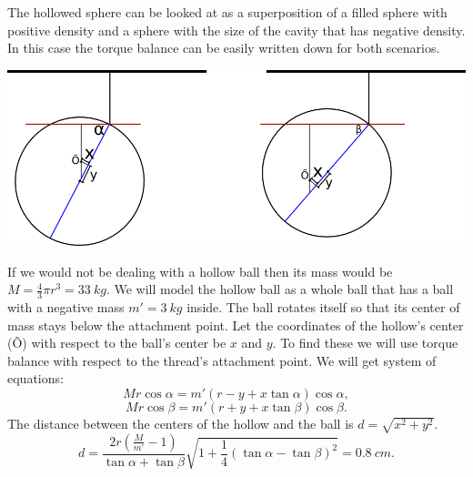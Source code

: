 \hinteng
The hollowed sphere can be looked at as a superposition of a filled sphere with positive density and a sphere with the size of the cavity that has negative density. In this case the torque balance can be easily written down for both scenarios.

\solueng
\begin{center}
\includegraphics[width=\textwidth]{2013-v2g-09-kera}
\end{center}
If we would not be dealing with a hollow ball then its mass would be $M=\frac{4}{3}\pi r^3 = \SI{33}{kg}$. We will model the hollow ball as a whole ball that has a ball with a negative mass $m'=\SI{3}{kg}$ inside. The ball rotates itself so that its center of mass stays below the attachment point. Let the coordinates of the hollow’s center (Õ) with respect to the ball’s center be $x$ and $y$. To find these we will use torque balance with respect to the thread’s attachment point. We will get system of equations:
\[Mr \cos \alpha = m'(r-y+x \tan \alpha) \cos \alpha,\] 
\[Mr \cos \beta = m'(r+y+x \tan \beta) \cos \beta.\]
The distance between the centers of the hollow and the ball is $d=\sqrt{x^2+y^2}$.
\[ d=\frac{2r(\frac{M}{m'}-1)}{\tan\alpha+\tan\beta}\sqrt{1+\frac{1}{4}(\tan\alpha-\tan\beta)^2} = \SI{0,8}{cm}. \]
\probend